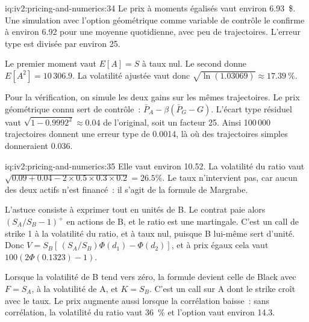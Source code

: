 \begin{solution}{iq:iv2:pricing-and-numerics:34}
Le prix à moments égalisés vaut environ 6.93~\$. Une simulation avec l'option géométrique comme variable de contrôle le confirme à environ 6.92 pour une moyenne quotidienne, avec peu de trajectoires. L'erreur type est divisée par environ 25.

Le premier moment vaut $E[A] = S$ à taux nul. Le second donne $E[A^2] = 10\,306.9$. La volatilité ajustée vaut donc $\sqrt{\ln(1.03069)} \approx 17.39~\%$.

Pour la vérification, on simule les deux gains sur les mêmes trajectoires. Le prix géométrique connu sert de contrôle~: $\bar P_A - \beta(\bar P_G - G)$. L'écart type résiduel vaut $\sqrt{1 - 0.9992^2} \approx 0.04$ de l'original, soit un facteur 25. Ainsi 100\,000 trajectoires donnent une erreur type de 0.0014, là où des trajectoires simples donneraient 0.036.

\end{solution}

\begin{solution}{iq:iv2:pricing-and-numerics:35}
Elle vaut environ 10.52. La volatilité du ratio vaut $\sqrt{0.09 + 0.04 - 2 \times 0.5 \times 0.3 \times 0.2} = 26.5\%$. Le taux n'intervient pas, car aucun des deux actifs n'est financé~: il s'agit de la formule de Margrabe.

L'astuce consiste à exprimer tout en unités de B. Le contrat paie alors $(S_A/S_B - 1)^+$ en actions de B, et le ratio est une martingale. C'est un call de strike 1 à la volatilité du ratio, et à taux nul, puisque B lui-même sert d'unité. Donc $V = S_B[\,(S_A/S_B)\Phi(d_1) - \Phi(d_2)]$, et à prix égaux cela vaut $100(2\Phi(0.1323) - 1)$.

Lorsque la volatilité de B tend vers zéro, la formule devient celle de Black avec $F = S_A$, à la volatilité de A, et $K = S_B$. C'est un call sur A dont le strike croît avec le taux. Le prix augmente aussi lorsque la corrélation baisse~: sans corrélation, la volatilité du ratio vaut 36~\% et l'option vaut environ 14.3.

\end{solution}

